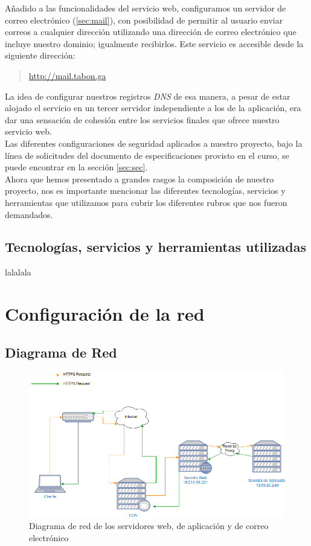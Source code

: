\documentclass[12pt]{article}
\begin{document}
Añadido a las funcionalidades del servicio web, configuramos un servidor de correo electrónico (\ref{sec:mail}), con posibilidad de permitir al usuario enviar correos a cualquier dirección utilizando una dirección de correo electrónico que incluye nuestro dominio; igualmente recibirlos. Este servicio es accesible desde la siguiente dirección:
\begin{quote}
  \href{http://mail.tabon.ga}{http://mail.tabon.ga}
\end{quote}
La idea de configurar nuestros registros \textit{DNS} de esa manera, a pesar de estar alojado el servicio en un tercer servidor independiente a los de la aplicación, era dar una sensación de cohesión entre los servicios finales que ofrece nuestro servicio web.\\

Las diferentes configuraciones de seguridad aplicados a nuestro proyecto, bajo la línea de solicitudes del documento de especificaciones provisto en el curso, se puede encontrar en la sección \ref{sec:sec}.\\

Ahora que hemos presentado a grandes rasgos la composición de nuestro proyecto, nos es importante
mencionar las diferentes tecnologías, servicios y herramientas que utilizamos para cubrir los diferentes rubros que nos fueron demandados.

\subsection{Tecnologías, servicios y herramientas utilizadas}\label{sec:tools}
lalalala

\section{Configuración de la red}

\subsection{Diagrama de Red}\label{sec:diag}
\begin{figure}[ht!]
  \centering
  \includegraphics[width=0.8\linewidth]{net_diagram}
  \caption{Diagrama de red de los servidores web, de aplicación y de correo electrónico}
\end{figure}
\end{document}
